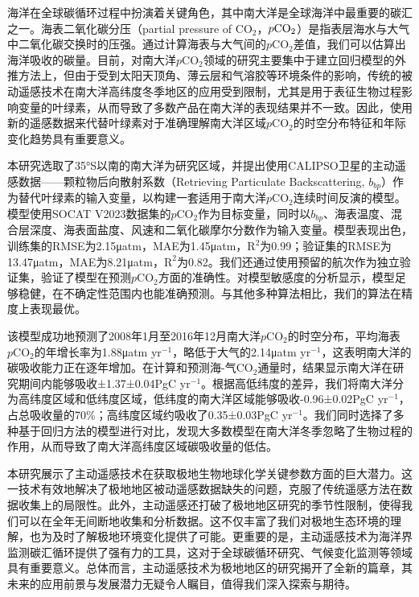 \cleardoublepage

海洋在全球碳循环过程中扮演着关键角色，其中南大洋是全球海洋中最重要的碳汇之一。海表二氧化碳分压（partial pressure of $\mathrm{CO_2}$，$p\rm CO_2$）是指表层海水与大气中二氧化碳交换时的压强。通过计算海表与大气间的$p\mathrm{CO_2}$差值，我们可以估算出海洋吸收的碳量。目前，对南大洋$p\mathrm{CO_2}$领域的研究主要集中于建立回归模型的外推方法上，但由于受到太阳天顶角、薄云层和气溶胶等环境条件的影响，传统的被动遥感技术在南大洋高纬度冬季地区的应用受到限制，尤其是用于表征生物过程影响变量的叶绿素，从而导致了多数产品在南大洋的表现结果并不一致。因此，使用新的遥感数据来代替叶绿素对于准确理解南大洋区域$p\mathrm{CO_2}$的时空分布特征和年际变化趋势具有重要意义。

本研究选取了35°S以南的南大洋为研究区域，并提出使用CALIPSO卫星的主动遥感数据——颗粒物后向散射系数（Retrieving Particulate Backscattering, $b_{bp}$）作为替代叶绿素的输入变量，以构建一套适用于南大洋$p\mathrm{CO_2}$连续时间反演的模型。模型使用SOCAT V2023数据集的$p\mathrm{CO_2}$作为目标变量，同时以$b_{bp}$、海表温度、混合层深度、海表面盐度、风速和二氧化碳摩尔分数作为输入变量。模型表现出色，训练集的RMSE为2.15μatm，MAE为1.45μatm，$\mathrm{R^2}$为0.99；验证集的RMSE为13.47μatm，MAE为8.21μatm，$\mathrm{R^2}$为0.82。我们还通过使用预留的航次作为独立验证集，验证了模型在预测$p\mathrm{CO_2}$方面的准确性。对模型敏感度的分析显示，模型足够稳健，在不确定性范围内也能准确预测。与其他多种算法相比，我们的算法在精度上表现最优。

该模型成功地预测了2008年1月至2016年12月南大洋$p\mathrm{CO_2}$的时空分布，平均海表$p\mathrm{CO_2}$的年增长率为1.88μatm yr$^{-1}$，略低于大气的2.14μatm yr$^{-1}$，这表明南大洋的碳吸收能力正在逐年增加。在计算和预测海-气$\mathrm{CO_2}$通量时，结果显示南大洋在研究期间内能够吸收±1.37±0.04PgC yr$^{-1}$。根据高低纬度的差异，我们将南大洋分为高纬度区域和低纬度区域，低纬度的南大洋区域能够吸收-0.96±0.02PgC yr$^{-1}$，占总吸收量的70\%；高纬度区域约吸收了0.35±0.03PgC yr$^{-1}$。我们同时选择了多种基于回归方法的模型进行对比，发现大多数模型在南大洋冬季忽略了生物过程的作用，从而导致了南大洋高纬度区域碳吸收量的低估。

本研究展示了主动遥感技术在获取极地生物地球化学关键参数方面的巨大潜力。这一技术有效地解决了极地地区被动遥感数据缺失的问题，克服了传统遥感方法在数据收集上的局限性。此外，主动遥感还打破了极地地区研究的季节性限制，使得我们可以在全年无间断地收集和分析数据。这不仅丰富了我们对极地生态环境的理解，也为及时了解极地环境变化提供了可能。更重要的是，主动遥感技术为海洋界监测碳汇循环提供了强有力的工具，这对于全球碳循环研究、气候变化监测等领域具有重要意义。总体而言，主动遥感技术为极地地区的研究揭开了全新的篇章，其未来的应用前景与发展潜力无疑令人瞩目，值得我们深入探索与期待。

